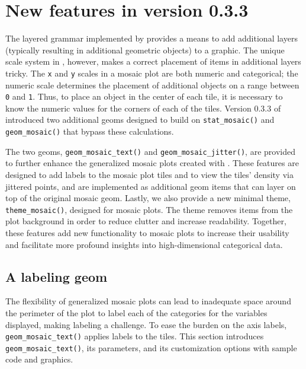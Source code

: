 \hypertarget{new-features-in-version-0.3.3}{%
\section{\texorpdfstring{New features in  version 0.3.3}{New features in  version 0.3.3}}\label{new-features-in-version-0.3.3}}

The layered grammar implemented by  provides a means to add additional layers (typically resulting in additional geometric objects) to a graphic. The unique scale system in , however, makes a correct placement of items in additional layers tricky. The \texttt{x} and \texttt{y} scales in a mosaic plot are both numeric and categorical; the numeric scale determines the placement of additional objects on a range between \texttt{0} and \texttt{1}. Thus, to place an object in the center of each tile, it is necessary to know the numeric values for the corners of each of the tiles. Version 0.3.3 of  introduced two additional geoms designed to build on \texttt{stat\_mosaic()} and \texttt{geom\_mosaic()} that bypass these calculations.

The two geoms, \texttt{geom\_mosaic\_text()} and \texttt{geom\_mosaic\_jitter()}, are provided to further enhance the generalized mosaic plots created with . These features are designed to add labels to the mosaic plot tiles and to view the tiles' density via jittered points, and are implemented as additional geom items that can layer on top of the original mosaic geom. Lastly, we also provide a new minimal theme, \texttt{theme\_mosaic()}, designed for mosaic plots. The theme removes items from the plot background in order to reduce clutter and increase readability. Together, these features add new functionality to mosaic plots to increase their usability and facilitate more profound insights into high-dimensional categorical data.

\hypertarget{a-labeling-geom}{%
\subsection{A labeling geom}\label{a-labeling-geom}}

The flexibility of generalized mosaic plots can lead to inadequate space around the perimeter of the plot to label each of the categories for the variables displayed, making labeling a challenge. To ease the burden on the axis labels, \texttt{geom\_mosaic\_text()} applies labels to the tiles. This section introduces \texttt{geom\_mosaic\_text()}, its parameters, and its customization options with sample code and graphics.

